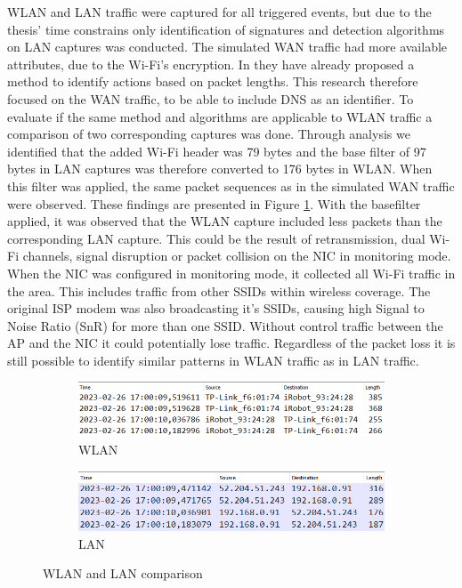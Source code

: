 \gls{WLAN} and \gls{LAN} traffic were captured for all triggered events, but due to the thesis' time constrains only identification of signatures and detection algorithms on \gls{LAN} captures was conducted. The simulated \gls{WAN} traffic had more available attributes, due to the \gls{Wi-Fi}'s encryption. In  \cite{pingpong_trimananda2020packet} they have already proposed a method to identify actions based on packet lengths. This research therefore focused on the \gls{WAN} traffic, to be able to include \gls{DNS} as an identifier. To evaluate if the same method and algorithms are applicable to \gls{WLAN} traffic a comparison of two corresponding captures was done. Through analysis we identified that the added \gls{Wi-Fi} header was 79 bytes and the base filter of 97 bytes in \gls{LAN} captures was therefore converted to 176 bytes in \gls{WLAN}. When this filter was applied, the same packet sequences as in the simulated \gls{WAN} traffic were observed. These findings are presented in Figure \ref{fig:WLANLANHeader}. With the basefilter applied, it was observed that the \gls{WLAN} capture included less packets than the corresponding \gls{LAN} capture. This could be the result of retransmission, dual \gls{Wi-Fi} channels, signal disruption or packet collision on the \gls{NIC} in monitoring mode. When the \gls{NIC} was configured in monitoring mode, it collected all \gls{Wi-Fi} traffic in the area. This includes traffic from other \gls{SSID}s within wireless coverage. The original \gls{ISP} modem was also broadcasting it's \gls{SSID}s, causing high Signal to Noise Ratio (SnR) for more than one \gls{SSID}. Without control traffic between the \gls{AP} and the \gls{NIC} it could potentially lose traffic. Regardless of the packet loss it is still possible to identify similar patterns in \gls{WLAN} traffic as in \gls{LAN} traffic. 

\begin{figure}[H]
    \centering
    \begin{subfigure}[b]{0.9\textwidth}
        \includegraphics[width=\textwidth]{figures/WLANLANComparison.png}
        \caption{\gls{WLAN}}
    \end{subfigure}
    \quad
    \begin{subfigure}[b]{0.9\textwidth}
        \includegraphics[width=\textwidth]{figures/LANWLANcomparison.png}
        \caption{\gls{LAN}}
    \end{subfigure}
    
    \caption{\gls{WLAN} and \gls{LAN} comparison}
    \label{fig:WLANLANHeader}
\end{figure}

